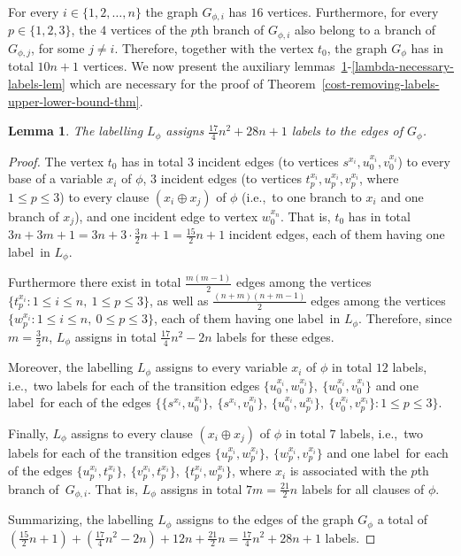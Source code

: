 \documentclass[a4paper,UKenglish]{article}
\newtheorem{lemma}{Lemma}
\begin{document}
For every $i\in \{1,2,\ldots ,n\}$ the graph $G_{\phi ,i}$ has $16$
vertices. Furthermore, for every $p\in \{1,2,3\}$, the $4$ vertices of the $p
$th branch of $G_{\phi ,i}$ also belong to a branch of $G_{\phi ,j}$, for
some $j\neq i$. Therefore, together with the vertex $t_{0}$, the graph $G_{\phi }$ has in total $10n+1$ vertices. We now present the auxiliary
lemmas~\ref{total-number-labels-lem}-\ref{lambda-necessary-labels-lem} which
are necessary for the proof of Theorem~\ref {cost-removing-labels-upper-lower-bound-thm}.


\begin{lemma}
\label{total-number-labels-lem}
The labelling $L _{\phi }$ assigns $\frac{17}{4}n^{2}+28n+1$ labels to the edges of $G_{\phi}$.
\end{lemma}

\begin{proof}
The vertex $t_{0}$ has in total $3$ incident edges (to vertices $s^{x_{i}},u_{0}^{x_{i}},v_{0}^{x_{i}}$) to every base of a variable $x_{i}$
of $\phi $, $3$ incident edges (to vertices $t_{p}^{x_{i}},u_{p}^{x_{i}},v_{p}^{x_{i}}$, where $1\leq p\leq 3$) to every
clause $(x_{i}\oplus x_{j})$ of $\phi $ (i.e.,~to one branch to $x_{i}$ and
one branch of $x_{j}$), and one incident edge to vertex $w_{0}^{x_{n}}$.
That is, $t_{0}$ has in total $3n+3m+1=3n+3\cdot \frac{3}{2}n+1=\frac{15}{2}n+1$ incident edges, each of them having one label~in $L _{\phi }$.

Furthermore there exist in total $\frac{m(m-1)}{2} $ edges among the
vertices $\{t_{p}^{x_{i}}:1\leq i\leq n,\ 1\leq p\leq 3\}$, as well as $\frac{(n+m)(n+m-1)}{2}$ edges among the vertices $\{w_{p}^{x_{i}}:1\leq
i\leq n,\ 0\leq p\leq 3\}$, each of them having one label~in $L _{\phi
}$. Therefore, since $m=\frac{3}{2}n$, $L _{\phi }$ assigns in total $\frac{17}{4}n^{2}- 2n$ labels for these edges.

Moreover, the labelling $L _{\phi }$ assigns to every variable $x_{i}$
of $\phi $ in total $12$ labels, i.e.,~two labels for each of the transition
edges $   \{ u_{0}^{x_{i}} , w_{0}^{x_{i}} \}   , \    \{   w_{0}^{x_{i}}  ,  v_{0}^{x_{i}}   \}$ and one
label~for each of the edges $\{   \{  s^{x_{i}}  ,  u_{0}^{x_{i}}   \}    ,\    \{  s^{x_{i}}  ,   v_{0}^{x_{i}}  \} ,\   \{ u_{0}^{x_{i}}  ,  u_{p}^{x_{i}}  \} , \  \{  v_{0}^{x_{i}}  ,  v_{p}^{x_{i}}  \}  :1\leq p\leq 3\}$.

Finally, $L _{\phi }$ assigns to every clause $(x_{i}\oplus x_{j})$ of 
$\phi $ in total $7$ labels, i.e.,~two labels for each of the transition
edges $  \{ u_{p}^{x_{i}}  ,  w_{p}^{x_{i}}  \},\ \{  w_{p}^{x_{i}}  ,  v_{p}^{x_{i}}  \}  $ and one
label~for each of the edges $   \{u_{p}^{x_{i}}  ,  t_{p}^{x_{i}}  \} ,\
  \{ v_{p}^{x_{i}}  ,  t_{p}^{x_{i}}  \},\ \{  t_{p}^{x_{i}}  ,  w_{p}^{x_{i}}  \}   $, where $x_{i}$ is
associated with the $p$th branch of~$G_{\phi ,i}$. That is, $L _{\phi
} $ assigns in total $7m=\frac{21}{2}n$ labels for all clauses of $\phi $.

Summarizing, the labelling $L _{\phi }$ assigns to the edges of the graph $G_{\phi }$ a total of
$\left( \frac{15}{2}n+1\right) +\left( \frac{17}{4}n^{2}- 2n\right) +12n+\frac{21}{2}n=\frac{17}{4}n^{2}+28n+1$ labels.
\end{proof}
\end{document}
